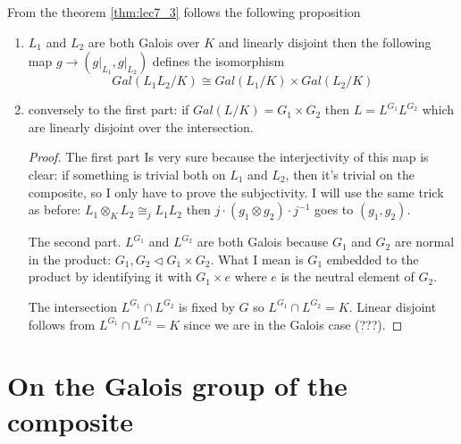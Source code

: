 From the theorem \ref{thm:lec7_3} follows the following proposition
\begin{proposition}
  \begin{enumerate}
  \item $L_1$ and $L_2$ are both Galois over $K$ and linearly disjoint then
    the following map $g \to \left(\left. g \right|_{L_1}, \left. g
    \right|_{L_2}\right)$ defines the isomorphism
    \[
    Gal\left(L_1 L_2/K\right) \cong Gal\left(L_1/K\right) \times Gal\left(L_2/K\right)
    \]
  \item conversely to the first part: if
    $Gal\left(L/K\right) = G_1 \times G_2$ then $L = L^{G_1} L^{G_2}$
    which are linearly disjoint over the intersection.
    \begin{proof}
      The first part Is very sure because the interjectivity of this
      map is clear: if something is trivial both on $L_1$ and $L_2$,
      then  it's trivial on the composite, so I only have to prove the
      subjectivity.  I will use the same trick as before:
      $L_1 \otimes_K L_2 \cong_j L_1 L_2$ then
      $j \cdot \left(g_1 \otimes g_2\right) \cdot j^{-1}$ goes to
      $\left(g_1, g_2\right)$.

      The second part. $L^{G_1}$ and $L^{G_2}$ are both Galois because
      $G_1$ and $G_2$ are normal in the product:
      $G_1, G_2 \triangleleft G_1 \times G_2$. What I mean is $G_1$
      embedded to the product by identifying it with $G_1 \times e$
      where $e$ is the neutral element of $G_2$.

      The intersection $L^{G_1} \cap L^{G_2}$ is fixed by $G$ so
      $L^{G_1} \cap L^{G_2} = K$. Linear disjoint follows from
      $L^{G_1} \cap L^{G_2} = K$ since we are in the Galois case
      (???). 
    \end{proof}
  \end{enumerate}
  \label{prop:lec7_3}
\end{proposition}


\section{On the Galois group of the composite}

